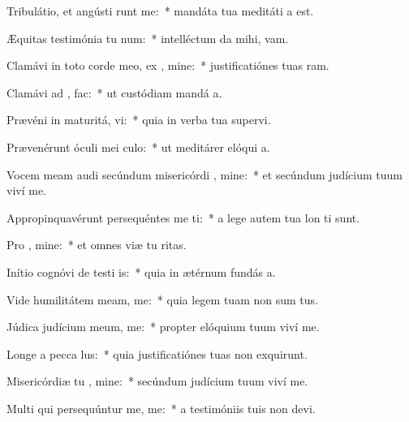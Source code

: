 \item Tribulátio, et angústi runt me:~* mandáta tua meditáti a est.
\item Æquitas testimónia tu  num:~* intelléctum da mihi,  vam.
\item Clamávi in toto corde meo, ex , mine:~* justificatiónes tuas ram.
\item Clamávi ad ,   fac:~* ut custódiam mandá a.
\item Prævéni in maturitá,  vi:~* quia in verba tua supervi.
\item Prævenérunt óculi mei   culo:~* ut meditárer elóqui a.
\item Vocem meam audi secúndum misericórdi , mine:~* et secúndum judícium tuum viví me.
\item Appropinquavérunt persequéntes me ti:~* a lege autem tua lon ti sunt.
\item Pro  , mine:~* et omnes viæ tu ritas.
\item Inítio cognóvi de testi is:~* quia in ætérnum fundás a.
\item Vide humilitátem meam,   me:~* quia legem tuam non sum tus.
\item Júdica judícium meum,   me:~* propter elóquium tuum viví me.
\item Longe a pecca lus:~* quia justificatiónes tuas non exquirunt.
\item Misericórdiæ tu , mine:~* secúndum judícium tuum viví me.
\item Multi qui persequúntur me,   me:~* a testimóniis tuis non devi.
